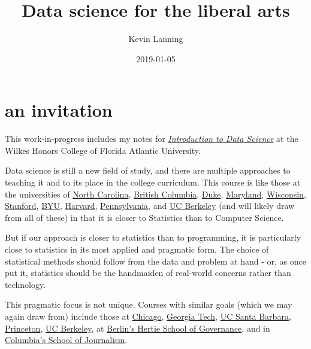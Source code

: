 \documentclass[openany]{book}
\title{Data science for the liberal arts}
\author{Kevin Lanning}
\date{2019-01-05}
\begin{document}
\maketitle

{
\setcounter{tocdepth}{1}
\tableofcontents
}
\hypertarget{section}{%
\chapter*{}\label{section}}

\hypertarget{an-invitation}{%
\chapter*{an invitation}\label{an-invitation}}

This work-in-progress includes my notes for \href{https://kevinlanning.github.io/DataSciSpring2019/}{\emph{\emph{Introduction to Data Science}}} at the Wilkes Honors College of Florida Atlantic University.

Data science is still a new field of study, and there are multiple approaches to teaching it and to its place in the college curriculum. This course is like those at the universities of \href{https://idc9.github.io/stor390/}{North Carolina}, \href{https://github.com/STAT545-UBC/STAT545-UBC.github.io}{British Columbia}, \href{https://www2.stat.duke.edu/courses/Fall15/sta112.01/}{Duke}, \href{http://www.hcbravo.org/IntroDataSci/calendar/}{Maryland}, \href{http://pages.stat.wisc.edu/~yandell/R_for_data_sciences/syllabus.html}{Wisconsin}, \href{https://github.com/dcl-2017-04/curriculum}{Stanford}, \href{https://byuistats.github.io/M335/syllabus.html}{BYU}, \href{http://datasciencelabs.github.io/}{Harvard}, \href{https://github.com/MUSA-620-Spring-2017/Course-Materials}{Pennsylvania}, and \href{https://github.com/FAUDataScience/stat259}{UC Berkeley} (and will likely draw from all of these) in that it is closer to Statistics than to Computer Science.

But if our approach is closer to statistics than to programming, it is particularly close to statistics in its most applied and pragmatic form. The choice of statistical methods should follow from the data and problem at hand - or, as \citet{loevinger1957objective} once put it, statistics should be the handmaiden of real-world concerns rather than technology.

This pragmatic focus is not unique. Courses with similar goals (which we may again draw from) include those at \href{https://github.com/UC-MACSS/persp-analysis}{Chicago}, \href{https://github.com/jacobeisenstein/gt-css-class}{Georgia Tech}, \href{https://github.com/raviolli77/dataScience-UCSBProjectGroup-Syllabus}{UC Santa Barbara}, \href{http://www.princeton.edu/~mjs3/soc596_f2016/}{Princeton}, \href{https://github.com/rochelleterman/PS239T}{UC Berkeley}, at \href{https://github.com/HertieDataScience/SyllabusAndLectures}{Berlin's Hertie School of Governance}, and in \href{https://github.com/tommeagher/data1-fall2015}{Columbia's School of Journalism}.
\end{document}
